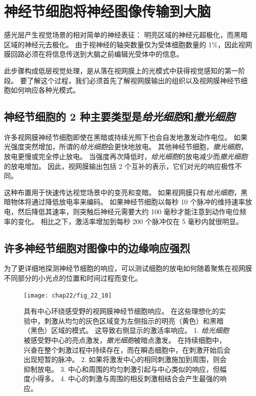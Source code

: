 \section{神经节细胞将神经图像传输到大脑}

感光层产生视觉场景的相对简单的神经表征：
明亮区域的神经元超极化，而黑暗区域的神经元去极化。
由于视神经的轴突数量仅为受体细胞数量的 1\%，因此视网膜回路必须在将信息传送到大脑之前编辑光受体中的信息。


此步骤构成低层视觉处理，是从落在视网膜上的光模式中获得视觉感知的第一阶段。
要了解这个过程，我们必须首先了解视网膜输出的组织以及视网膜神经节细胞如何响应各种光模式。



\subsection{神经节细胞的 2 种主要类型是\textit{给光细胞}和\textit{撤光细胞}}

许多视网膜神经节细胞即使在黑暗或持续光照下也会自发地激发动作电位。
如果光强度突然增加，所谓的\textit{给光细胞}会更快地放电。
其他神经节细胞，\textit{撤光细胞}，放电更慢或完全停止放电。
当强度再次降低时，\textit{给光细胞}的放电减少而\textit{撤光细胞}的放电增加。
因此，视网膜输出包括 2 个互补的表示，它们对光的响应极性不同。


这种布置用于快速传达视觉场景中的变亮和变暗。
如果视网膜只有\textit{给光细胞}，黑暗物体将通过降低放电率来编码。
如果神经节细胞以每秒 10 个脉冲的维持速率放电，然后降低其速率，则突触后神经元需要大约 100 毫秒才能注意到动作电位频率的变化。
相比之下，激活率增加到每秒 200 个脉冲仅在 5 毫秒内就很明显。



\subsection{许多神经节细胞对图像中的边缘响应强烈}

为了更详细地探测神经节细胞的响应，可以测试细胞的放电如何随着聚焦在视网膜不同部分的小光点的位置和时间过程而变化。


\begin{figure}[htbp]
	\centering
	\texttt{[image: chap22/fig\_22\_10]}
	\caption{具有中心环绕感受野的视网膜神经节细胞响应。 
		在这些理想化的实验中，刺激从均匀的灰色区域变为左侧指示的明亮（黄色）和黑暗（黑色）区域的模式。 这导致右侧显示的激活率响应。 
		1. \textit{给光细胞}被感受野中心的亮点激发，\textit{撤光细胞}被暗点激发。
		在持续细胞中，兴奋在整个刺激过程中持续存在，而在瞬态细胞中，在刺激开始后会出现短暂的脉冲。 
		2. 如果将激发中心的相同刺激施加到周围，则会抑制放电。 
		3. 中心和周围的均匀刺激引起与中心类似的响应，但幅度小得多。 
		4. 中心的刺激与周围的相反刺激相结合会产生最强的响应。}
	\label{fig:22_10}
\end{figure}



